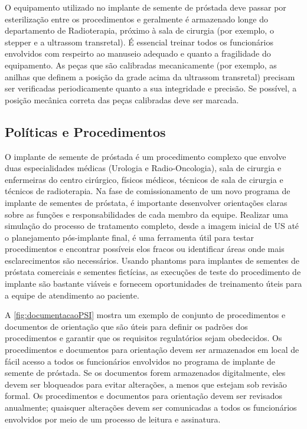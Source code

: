 \documentclass[11pt,a4paper]{article}
\newcounter{exemplo}
\begin{document}
	O equipamento utilizado no implante de semente de próstada deve passar por esterilização entre os procedimentos e geralmente é armazenado longe do departamento de Radioterapia, próximo à sala de cirurgia (por exemplo, o stepper e a ultrassom transretal). É essencial treinar todos os funcionários envolvidos com respeirto ao manuseio adequado e quanto a fragilidade do equipamento. As peças que são calibradas mecanicamente (por exemplo, as anilhas que definem a posição da grade acima da ultrassom transretal) precisam ser verificadas periodicamente quanto a sua integridade e precisão. Se possível, a posição mecânica correta das peças calibradas deve ser marcada.

\subsection*{Políticas e Procedimentos}

	O implante de semente de próstada é um procedimento complexo que envolve duas especialidades médicas (Urologia e Radio-Oncologia), sala de cirurgia e enfermeiras do centro cirúrgico, físicos médicos, técnicos de sala de cirurgia e técnicos de radioterapia. Na fase de comissionamento de um novo programa de implante de sementes de próstata, é importante desenvolver orientações claras sobre as funções e responsabilidades de cada membro da equipe. Realizar uma simulação do processo de tratamento completo, desde a imagem inicial de US até o planejamento pós-implante final, é uma ferramenta útil para testar procedimentos e encontrar possíveis elos fracos ou identificar áreas onde mais esclarecimentos são necessários. Usando phantoms para implantes de sementes de próstata comerciais e sementes fictícias, as execuções de teste do procedimento de implante são bastante viáveis e fornecem oportunidades de treinamento úteis para a equipe de atendimento ao paciente.

	A \ref{fig:documentacaoPSI} mostra um exemplo de conjunto de procedimentos e documentos de orientação que são úteis para definir os padrões dos procedimentos e garantir que os requisitos regulatórios sejam obedecidos. Os procedimentos e documentos para orientação devem ser armazenados em local de fácil acesso a todos os funcionários envolvidos no programa de implante de semente de próstada. Se os documentos forem armazenados digitalmente, eles devem ser bloqueados para evitar alterações, a menos que estejam sob revisão formal. Os procedimentos e documentos para orientação devem ser revisados anualmente; quaisquer alterações devem ser comunicadas a todos os funcionários envolvidos por meio de um processo de leitura e assinatura.
	
\end{document}
